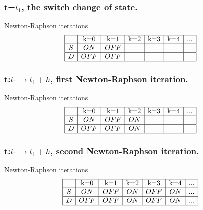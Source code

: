 \frame
{

\frametitle{t=$t_1$, the switch change of state.}
  \begin{figure}[!h]
   \centerline{
   \scalebox{0.9}{
    
    }
 } 
 \end{figure}
  \begin{block}{Newton-Raphson iterations}
\begin{equation}
\begin{array}{|c|c|c|c|c|c|c|}
\hline
&$k=0$&$k=1$&$k=2$&$k=3$&$k=4$&...\\
\hline
S&ON&OFF&&&&\\
\hline
D&OFF&OFF&&&&\\
\hline
\end{array}
\end{equation}
\end{block}

 }
  \frame
{

\frametitle{t:$t_1 \to t_1+h$, first Newton-Raphson iteration.}
  \begin{figure}[!h]
   \centerline{
   \scalebox{0.9}{
    
    }
 } 
 \end{figure}
  \begin{block}{Newton-Raphson iterations}
\begin{equation}
\begin{array}{|c|c|c|c|c|c|c|}
\hline
&$k=0$&$k=1$&$k=2$&$k=3$&$k=4$&...\\
\hline
S&ON&OFF&ON&&&\\
\hline
D&OFF&OFF&ON&&&\\
\hline
\end{array}
\end{equation}
\end{block}


 }
  \frame
{

\frametitle{t:$t_1 \to t_1+h$, second Newton-Raphson iteration.}
  \begin{figure}[!h]
   \centerline{
   \scalebox{0.9}{
    
    }
 } 
 \end{figure}
   \begin{block}{Newton-Raphson iterations}
\begin{equation}
\begin{array}{|c|c|c|c|c|c|c|}
\hline
&$k=0$&$k=1$&$k=2$&$k=3$&$k=4$&...\\
\hline
S&ON&OFF&ON&OFF&ON&...\\
\hline
D&OFF&OFF&ON&OFF&ON&...\\
\hline
\end{array}
\end{equation}
\end{block}

 }
